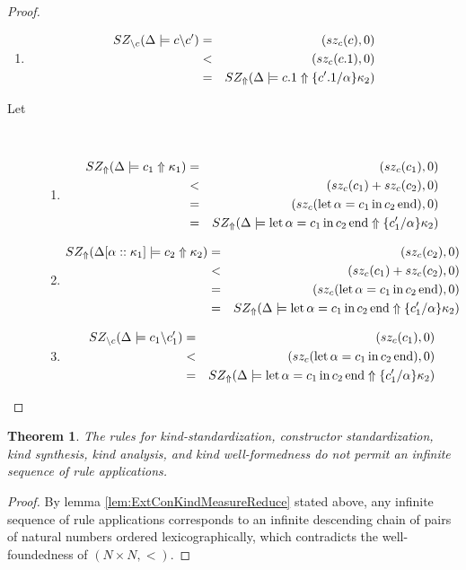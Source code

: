 \documentclass[12pt,twoside,fleqn]{amsart}
\theoremstyle{plain}
\newtheorem{thm}{Theorem}
\theoremstyle{plain}
\theoremstyle{definition}
\begin{document}
\begin{proof}
\begin{itemize}
\begin{enumerate}
\item 
\begin{eqnarray*}
SZ_{\backslash c}(\Delta   \models c  \backslash c'  ) & = & (sz_{c}(c ),0)\\
 & < & (sz_{c}(c.1 ),0)\\
 & = & SZ_{\Uparrow }(\Delta  \models c.1 \Uparrow \{c'.1 /\alpha  \}\kappa _{2} )
\end{eqnarray*}

\end{enumerate}
\begin{description}
\item [Let]~

\begin{enumerate}
\item 
\begin{eqnarray*}
SZ_{\Uparrow }(\Delta  \models c_{1} \Uparrow \kappa _{1} ) & = & (sz_{c}(c_{1} ),0)\\
 & < & (sz_{c}(c_{1} )+sz_{c}(c_{2} ),0)\\
 & = & (sz_{c}(\mathrm{let}\, \alpha  =c_{1} \, \mathrm{in}\, c_{2} \, \mathrm{end} ),0)\\
 & = & SZ_{\Uparrow }(\Delta  \models \mathrm{let}\, \alpha  =c_{1} \, \mathrm{in}\, c_{2} \, \mathrm{end} \Uparrow \{c_{1}' /\alpha  \}\kappa _{2} )
\end{eqnarray*}

\item 
\begin{eqnarray*}
SZ_{\Uparrow }(\Delta [\alpha ::\kappa _{1}] \models c_{2} \Uparrow \kappa _{2} ) & = & (sz_{c}(c_{2} ),0)\\
 & < & (sz_{c}(c_{1} )+sz_{c}(c_{2} ),0)\\
 & = & (sz_{c}(\mathrm{let}\, \alpha  =c_{1} \, \mathrm{in}\, c_{2} \, \mathrm{end} ),0)\\
 & = & SZ_{\Uparrow }(\Delta  \models \mathrm{let}\, \alpha  =c_{1} \, \mathrm{in}\, c_{2} \, \mathrm{end} \Uparrow \{c_{1}' /\alpha  \}\kappa _{2} )
\end{eqnarray*}

\item 
\begin{eqnarray*}
SZ_{\backslash c}(\Delta   \models c_{1}  \backslash c_{1}'  ) & = & (sz_{c}(c_{1} ),0)\\
 & < & (sz_{c}(\mathrm{let}\, \alpha  =c_{1} \, \mathrm{in}\, c_{2} \, \mathrm{end} ),0)\\
 & = & SZ_{\Uparrow }(\Delta  \models \mathrm{let}\, \alpha  =c_{1} \, \mathrm{in}\, c_{2} \, \mathrm{end} \Uparrow \{c_{1}' /\alpha  \}\kappa _{2} )
\end{eqnarray*}

\end{enumerate}
\end{description}
\end{itemize}
\end{proof}
\begin{thm}
The rules for kind-standardization, constructor standardization, kind synthesis,
kind analysis, and kind well-formedness do not permit an infinite sequence of
rule applications.
\end{thm}
\begin{proof}
By lemma \ref{lem:ExtConKindMeasureReduce} stated above, any infinite sequence
of rule applications corresponds to an infinite descending chain of pairs of
natural numbers ordered lexicographically, which contradicts the well-foundedness
of \( (N\times N,<) \). 

\end{proof}
\end{document}
